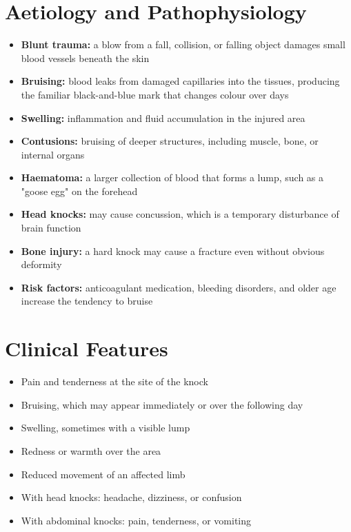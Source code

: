 \section*{Aetiology and Pathophysiology}
\begin{itemize}
    \item \textbf{Blunt trauma:} a blow from a fall, collision, or falling object damages small blood vessels beneath the skin
    \item \textbf{Bruising:} blood leaks from damaged capillaries into the tissues, producing the familiar black-and-blue mark that changes colour over days
    \item \textbf{Swelling:} inflammation and fluid accumulation in the injured area
    \item \textbf{Contusions:} bruising of deeper structures, including muscle, bone, or internal organs
    \item \textbf{Haematoma:} a larger collection of blood that forms a lump, such as a "goose egg" on the forehead
    \item \textbf{Head knocks:} may cause concussion, which is a temporary disturbance of brain function
    \item \textbf{Bone injury:} a hard knock may cause a fracture even without obvious deformity
    \item \textbf{Risk factors:} anticoagulant medication, bleeding disorders, and older age increase the tendency to bruise
\end{itemize}

\section*{Clinical Features}
\begin{itemize}
    \item Pain and tenderness at the site of the knock
    \item Bruising, which may appear immediately or over the following day
    \item Swelling, sometimes with a visible lump
    \item Redness or warmth over the area
    \item Reduced movement of an affected limb
    \item With head knocks: headache, dizziness, or confusion
    \item With abdominal knocks: pain, tenderness, or vomiting
\end{itemize}

